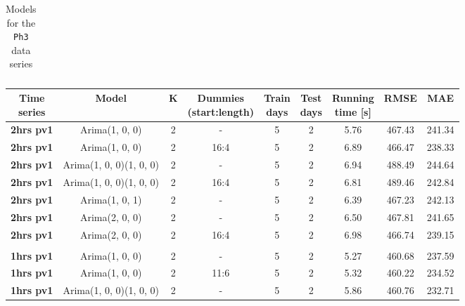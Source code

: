 \documentclass[12pt,a4paper,titlepage]{report}
\begin{document}
\begin{appendices}
\begin{table}[h]
\begin{tabular}{|c|c|c|c|c|c|c|c|c|}
\end{tabular}

\centering
\caption{Models for the \texttt{Ph3} data series}
\label{ph3results}
\end{table}


\begin{table}[h]
    \begin{tabular}{|c|c|c|c|c|c|c|c|c|}
        \hline
        \makecell{\textbf{Time} \\ \textbf{series}} & \textbf{Model}          & \textbf{K} & \makecell{\textbf{Dummies} \\ \textbf{(start:length)}} & \makecell{\textbf{Train} \\ \textbf{days}} & \makecell{\textbf{Test}\\ \textbf{days}} & \makecell{\textbf{Running} \\ \textbf{time {[}s{]}}} & \textbf{RMSE} & \textbf{MAE} \\ \hline
        \textbf{2hrs pv1} & Arima(1, 0, 0)          & 2 & -    & 5 & 2 & 5.76     & 467.43 & 241.34 \\ \hline
        \textbf{2hrs pv1} & Arima(1, 0, 0)          & 2 & 16:4 & 5 & 2 & 6.89     & 466.47 & 238.33 \\ \hline
        \textbf{2hrs pv1} & Arima(1, 0, 0)(1, 0, 0) & 2 & -    & 5 & 2 & 6.94     & 488.49 & 244.64 \\ \hline
        \textbf{2hrs pv1} & Arima(1, 0, 0)(1, 0, 0) & 2 & 16:4 & 5 & 2 & 6.81     & 489.46 & 242.84 \\ \hline
        \textbf{2hrs pv1} & Arima(1, 0, 1)          & 2 & -    & 5 & 2 & 6.39     & 467.23 & 242.13 \\ \hline
        \textbf{2hrs pv1} & Arima(2, 0, 0)          & 2 & -    & 5 & 2 & 6.50     & 467.81 & 241.65 \\ \hline
        \textbf{2hrs pv1} & Arima(2, 0, 0)          & 2 & 16:4 & 5 & 2 & 6.98     & 466.74 & 239.15 \\ \hline
        \textbf{}         &                         &   &      &   &   &          &        &        \\ \hline
        \textbf{1hrs pv1} & Arima(1, 0, 0)          & 2 & -    & 5 & 2 & 5.27     & 460.68 & 237.59 \\ \hline
        \textbf{1hrs pv1} & Arima(1, 0, 0)          & 2 & 11:6 & 5 & 2 & 5.32     & 460.22 & 234.52 \\ \hline
        \textbf{1hrs pv1} & Arima(1, 0, 0)(1, 0, 0) & 2 & -    & 5 & 2 & 5.86     & 460.76 & 232.71 \\ \hline

\end{tabular}
\end{table}
\end{appendices}
\end{document}
